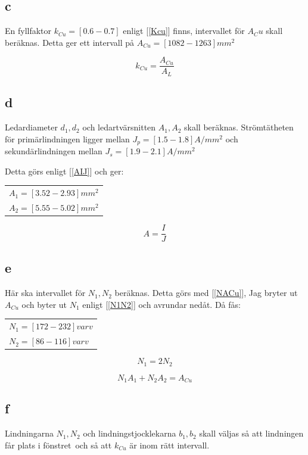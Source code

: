 \documentclass{article}
\begin{document}
\subsection{c}
En fyllfaktor $k_{Cu}=[0.6 - 0.7]$ enligt [\ref{Kcu}]  finns, intervallet för $A_Cu$ skall beräknas.
Detta ger ett intervall på $A_{Cu}=[1082 - 1263] mm^2$


\begin{equation}
  k_{Cu}=\frac{A_{Cu}}{A_L}
  \label{Kcu}
\end{equation}

\subsection{d}
Ledardiameter $d_1,d_2$ och ledartvärsnitten $A_1,A_2$ skall beräknas.
Strömtätheten för primärlindningen ligger mellan $J_p=[1.5 - 1.8] A/mm^2$ och sekundärlindningen mellan $J_s=[1.9 - 2.1] A/mm^2$

Detta görs enligt [\ref{AIJ}] och ger:
\begin{tabular}{|l}
  $A_1=[ 3.52 - 2.93] mm^2$\\
  $A_2=[ 5.55 - 5.02] mm^2$\\
\end{tabular}

\begin{equation}
  A=\frac{I}{J}
  \label{AIJ}
\end{equation}

\subsection{e}
Här ska intervallet för $N_1,N_2$ beräknas.
Detta görs med [\ref{NACu}], Jag bryter ut $A_{Cu}$ och byter ut $N_1$ enligt [\ref{N1N2}] och avrundar nedåt.
Då fås:

\begin{tabular}{|l}
  $N_1=[ 172 - 232]  varv$\\
  $N_2=[ 86 - 116]  varv$\\
\end{tabular}

\begin{equation}
  N_1=2N_2
  \label{N1N2}
\end{equation}

\begin{equation}
  N_1A_1+N_2A_2=A_{Cu}
  \label{NACu}
\end{equation}


\subsection{f}
Lindningarna $N_1,N_2$ och lindningstjocklekarna $b_1,b_2$ skall väljas så att lindningen får plats i fönstret\
och så att $k_{Cu}$ är inom rätt intervall.
\end{document}
